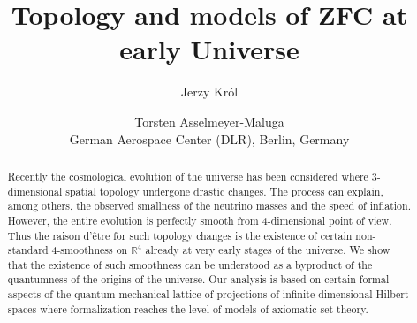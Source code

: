 \documentclass[12pt]{article}
\begin{document}
\title{Topology and models of ZFC at early Universe}
\author{ Jerzy Kr\'ol \\
\and 
Torsten Asselmeyer-Maluga \\ German Aerospace Center (DLR), Berlin, Germany
}

\date{}
\maketitle

\begin{abstract}
Recently the cosmological evolution of the universe has been considered where 3-dimensional spatial topology undergone drastic changes. The process can explain, among others, the observed smallness of the neutrino masses and the speed of inflation. However, the entire evolution is perfectly smooth from 4-dimensional point of view. Thus the raison d'{\^e}tre for such topology changes is the existence of certain non-standard 4-smoothness on $\mathbb{R}^4$ already at very early stages of the universe. 
We show that the existence of such smoothness can be understood as a byproduct of the quantumness of the origins of the universe. Our analysis is based on certain formal aspects of the quantum mechanical lattice of projections of infinite dimensional Hilbert spaces where formalization reaches the level of models of axiomatic set theory. 
   
\end{abstract}
\end{document}
